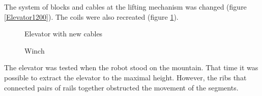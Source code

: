 \begin{enumerate*}
  \item The system of blocks and cables at the lifting mechanism was changed (figure \ref{Elevator1200}). The coils were also recreated (figure \ref{Elevator1300}).
  
  \begin{figure}[H]
  	\begin{minipage}[h]{0.53\linewidth}
  		\caption{Elevator with new cables}
  		\label{Elevator1200}
  	\end{minipage}
  	\hfill
  	\begin{minipage}[h]{0.3\linewidth}
  		\caption{Winch}
  		\label{Elevator1300}
  	\end{minipage}
  \end{figure}

  \item The elevator was tested when the robot stood on the mountain. That time it was possible to extract the elevator to the maximal height. However, the ribs that connected pairs of rails together obstructed the movement of the segments.


\end{enumerate*}
